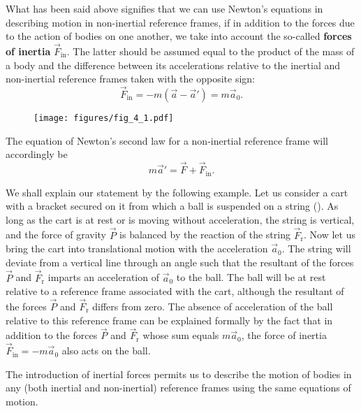 What has been said above signifies that we can use Newton's equations in describing motion in non-inertial reference frames, if in addition to the forces due to the action of bodies on one another, we take into account the so-called \textbf{forces of inertia} $\vec{F}_{\text{in}}$. The latter should be assumed equal to the product of the mass of a body and the difference between its accelerations relative to the inertial and non-inertial reference frames taken with the opposite sign:
\begin{equation}\label{eq:4_2}
\vec{F}_{\text{in}} = -m(\vec{a} - \vec{a}') = m\vec{a}_0.
\end{equation}

\begin{figure}[t]
	\begin{center}
		\texttt{[image: figures/fig\_4\_1.pdf]}
		\caption[]{}
		\label{fig:4_1}
	\end{center}
\end{figure}

\noindent
The equation of Newton's second law for a non-inertial reference frame will accordingly be
\begin{equation}\label{eq:4_3}
m\vec{a}' = \vec{F} + \vec{F}_{\text{in}}.
\end{equation}

We shall explain our statement by the following example. Let us consider a cart with a bracket secured on it from which a ball is suspended on a string (). As long as the cart is at rest or is moving without acceleration, the string is vertical, and the force of gravity $\vec{P}$ is balanced by the reaction of the string $\vec{F}_{\text{r}}$. Now let us bring the cart into translational motion with the acceleration $\vec{a}_0$. The string will deviate from a vertical line through an angle such that the resultant of the forces $\vec{P}$ and $\vec{F}_{\text{r}}$ imparts an acceleration of $\vec{a}_0$ to the ball. The ball will be at rest relative to a reference frame associated with the cart, although the resultant of the forces $\vec{P}$ and $\vec{F}_{\text{r}}$ differs from zero. The absence of acceleration of the ball relative to this reference frame can be explained formally by the fact that in addition to the forces $\vec{P}$ and $\vec{F}_{\text{r}}$ whose sum equals $m\vec{a}_0$, the force of inertia $\vec{F}_{\text{in}}=-m\vec{a}_0$ also acts on the ball.

The introduction of inertial forces permits us to describe the motion of bodies in any (both inertial and non-inertial) reference frames using the same equations of motion.

